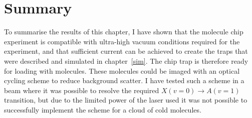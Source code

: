 \section{Summary}

To summarise the results of this chapter, I have shown that the molecule chip
experiment is compatible with ultra-high vacuum conditions required for the
\CaF{} experiment, and that sufficient current can be achieved to create the
traps that were described and simulated in chapter~\ref{sim}. The chip trap is
therefore ready for loading with \CaF{} molecules. These molecules could be
imaged with an optical cycling scheme to reduce background scatter. I have
tested such a scheme in a \CaF{} beam where it was possible to resolve the
required $X(v=0)\rightarrow A(v=1)$ transition, but due to the limited power of
the laser used it was not possible to successfully implement the scheme for a
cloud of cold molecules.
